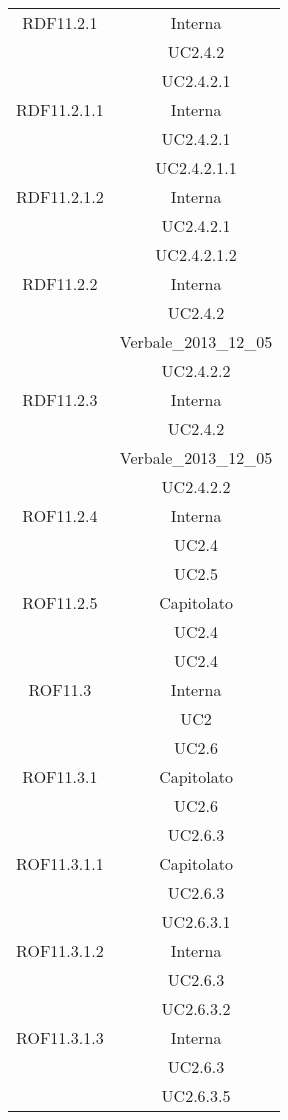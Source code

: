 \begin{longtable}{|c|c|}
\midrule
RDF11.2.1
& Interna\\
& UC2.4.2\\
& UC2.4.2.1\\

\midrule
RDF11.2.1.1
& Interna\\
& UC2.4.2.1\\
& UC2.4.2.1.1
\\

\midrule
RDF11.2.1.2
& Interna\\
& UC2.4.2.1\\
& UC2.4.2.1.2
\\

\midrule
RDF11.2.2
& Interna\\
& UC2.4.2\\
& Verbale\_2013\_12\_05\\
& UC2.4.2.2
\\

\midrule
RDF11.2.3
& Interna\\
& UC2.4.2\\
& Verbale\_2013\_12\_05\\
& UC2.4.2.2
\\

\midrule
ROF11.2.4
& Interna\\
& UC2.4\\
& UC2.5
\\

\midrule
ROF11.2.5
& Capitolato\\
& UC2.4\\
& UC2.4
\\

\midrule
ROF11.3
& Interna\\
& UC2\\
& UC2.6
\\

\midrule
ROF11.3.1
& Capitolato\\
& UC2.6\\
& UC2.6.3
\\

\midrule
ROF11.3.1.1
& Capitolato\\
& UC2.6.3\\
& UC2.6.3.1
\\

\midrule
ROF11.3.1.2
& Interna\\
& UC2.6.3\\
& UC2.6.3.2
\\

\midrule
ROF11.3.1.3
& Interna\\
& UC2.6.3\\
& UC2.6.3.5
\\


\end{longtable}
